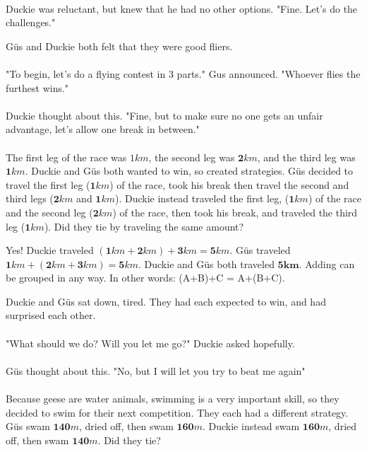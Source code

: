 \paragraph{} Duckie was reluctant, but knew that he had no other options. "Fine. Let's do the challenges."
\pagebreak
{}
{Güs and Duckie both felt that they were good fliers. 
\paragraph{} "To begin, let's do a flying contest in 3 parts." Gus announced. "Whoever flies the furthest wins."
\paragraph{} Duckie thought about this. "Fine, but to make sure no one gets an unfair advantage, let's allow one break in between."
\paragraph{} The first leg of the race was $1 km$, the second leg was $\mathbf{2} km$, and the third leg was $\mathbf{1} km$. Duckie and Güs both wanted to win, so created strategies. Güs decided to travel the first leg ($\mathbf{1} km$) of the race, took his break then travel the second and third legs ($\mathbf{2} km$ and $\mathbf{1} km$). Duckie instead traveled the first leg, ($\mathbf{1} km$) of the race and the second leg ($\mathbf{2} km$) of the race, then took his break, and traveled the third leg ($\mathbf{1} km$). Did they tie by traveling the same amount?}
{Yes! Duckie traveled $(\mathbf{1} km + \mathbf{2} km) + \mathbf{3} km = \mathbf{5} km$. Güs traveled $\mathbf{1} km + (\mathbf{2} km + \mathbf{3} km) = \mathbf{5}km$. Duckie and Güs both traveled $\mathbf{5km}$.}
{Adding can be grouped in any way. In other words: (A+B)+C = A+(B+C).}
{}
{Duckie and Güs sat down, tired. They had each expected to win, and had surprised each other. 
\paragraph{} "What should we do? Will you let me go?" Duckie asked hopefully. \paragraph{} Güs thought about this. "No, but I will let you try to beat me again" 
\paragraph{} Because geese are water animals, swimming is a very important skill, so they decided to swim for their next competition. They each had a different strategy. Güs swam $\mathbf{140} m$, dried off, then swam $\mathbf{160} m$. Duckie instead swam $\mathbf{160} m$, dried off, then swam $\mathbf{140} m$. Did they tie?}
